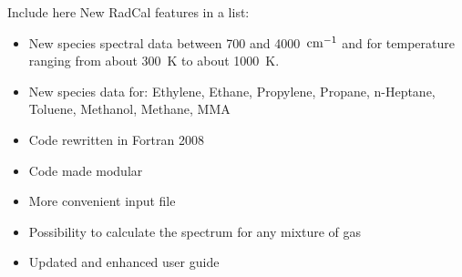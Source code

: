 Include here New RadCal features in a list:

\begin{itemize}
 \item New species spectral data between 700 and 4000~$\rm cm^{-1}$ and for temperature ranging from about 300~K to about 1000~K.
 \item New species data for: Ethylene, Ethane, Propylene, Propane, n-Heptane, Toluene, Methanol, Methane, MMA
 \item Code rewritten in Fortran 2008
 \item Code made modular
 \item More convenient input file
 \item Possibility to calculate the spectrum for any mixture of gas
 \item Updated and enhanced user guide
\end{itemize}
